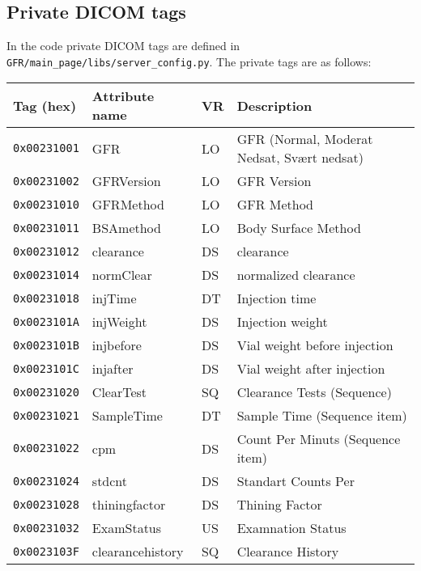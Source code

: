 \documentclass{article}
\begin{document}
\subsection{Private DICOM tags}
In the code private DICOM tags are defined in \texttt{GFR/main\_page/libs/server\_config.py}. The private tags are as follows:
\begin{table}[!htb]
	\centering
	\begin{tabular}{ | l | l | l | l | }
	\hline
	\textbf{Tag (hex)} & \textbf{Attribute name} & \textbf{VR} & \textbf{Description} \\ \hline
	\texttt{0x00231001} & GFR & LO & GFR (Normal, Moderat Nedsat, Svært nedsat) \\ \hline
	\texttt{0x00231002} & GFRVersion & LO & GFR Version \\ \hline
	\texttt{0x00231010} & GFRMethod & LO & GFR Method \\ \hline
	\texttt{0x00231011} & BSAmethod & LO & Body Surface Method \\ \hline
	\texttt{0x00231012} & clearance & DS & clearance \\ \hline
	\texttt{0x00231014} & normClear & DS & normalized clearance \\ \hline
	\texttt{0x00231018} & injTime & DT & Injection time \\ \hline
	\texttt{0x0023101A} & injWeight & DS & Injection weight \\ \hline
	\texttt{0x0023101B} & injbefore & DS & Vial weight before injection \\ \hline
	\texttt{0x0023101C} & injafter & DS & Vial weight after injection \\ \hline
	\texttt{0x00231020} & ClearTest & SQ & Clearance Tests (Sequence) \\ \hline
	\texttt{0x00231021} & SampleTime & DT & Sample Time (Sequence item) \\ \hline
	\texttt{0x00231022} & cpm & DS & Count Per Minuts (Sequence item) \\ \hline
	\texttt{0x00231024} & stdcnt & DS & Standart Counts Per \\ \hline
	\texttt{0x00231028} & thiningfactor & DS & Thining Factor \\ \hline
	\texttt{0x00231032} & ExamStatus & US & Examnation Status \\ \hline
	\texttt{0x0023103F} & clearancehistory & SQ & Clearance History \\ \hline
	\end{tabular}
\end{table}
\end{document}
